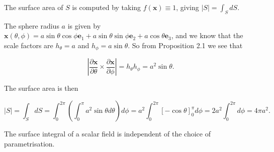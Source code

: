 \begin{method}
  The surface area of \(S\) is computed by taking \(f(\boldsymbol{x}) \equiv 1\), giving \(|S|=\int_S d S\).
\end{method}

\begin{example}[Use spherical coordinates to find the surface area of the sphere \(x^2+y^2+z^2=a^2\).]

The sphere radius \(a\) is given by \(\boldsymbol{x}(\theta, \phi)=a \sin \theta \cos \phi \boldsymbol{e}_1+a \sin \theta \sin \phi \boldsymbol{e}_2+a \cos \theta \boldsymbol{e}_3\), and we know that the scale factors are \(h_\theta=a\) and \(h_\phi=a \sin \theta\). So from Proposition 2.1 we see that

\[
\left|\frac{\partial \boldsymbol{x}}{\partial \theta} \times \frac{\partial \boldsymbol{x}}{\partial \phi}\right|=h_\theta h_\phi=a^2 \sin \theta .
\]

The surface area is then

\[
|S|=\int_S d S=\int_0^{2 \pi}\left(\int_0^\pi a^2 \sin \theta d \theta\right) d \phi=a^2 \int_0^{2 \pi}[-\cos \theta]_0^\pi d \phi=2 a^2 \int_0^{2 \pi} d \phi=4 \pi a^2 .
\]
\end{example}

\begin{proposition}
  The surface integral of a scalar field is independent of the choice of parametrisation.
\end{proposition}

